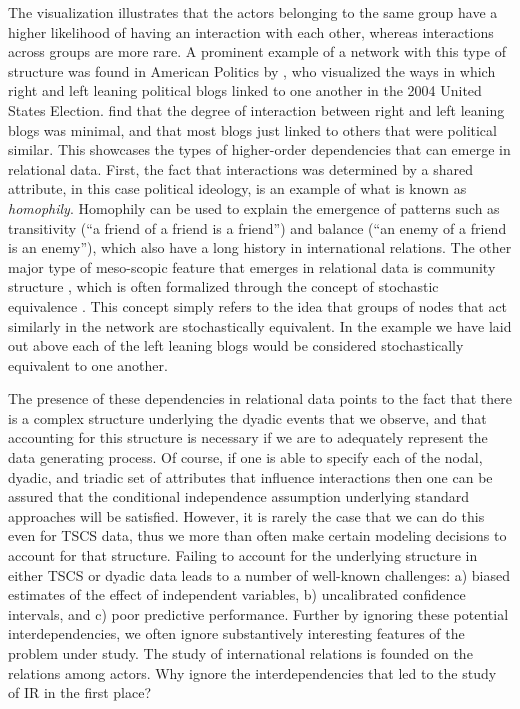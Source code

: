 The visualization illustrates that the actors belonging to the same group have a higher likelihood of having an interaction with each other, whereas interactions across groups are more rare. A prominent example of a network with this type of structure was found in American Politics by \citet{adamic:glance:2005}, who visualized the ways in which right and left leaning political blogs linked to one another in the 2004 United States Election. \citeauthor{adamic:glance:2005} find that the degree of interaction between right and left leaning blogs was minimal, and that most blogs just linked to others that were political similar. This showcases the types of higher-order dependencies that can emerge in relational data. First, the fact that interactions was determined by a shared attribute, in this case political ideology, is an example of what is known as \textit{homophily}. Homophily can be used to explain the emergence of patterns such as transitivity (``a friend of a friend is a friend'') and balance (``an enemy of a friend is an enemy''), which also have a long history in international relations. The other major type of meso-scopic feature that emerges in relational data is community structure \citep{mucha:etal:2010}, which is often formalized through the concept of stochastic equivalence \citep{anderson:etal:1992}. This concept simply refers to the idea that groups of nodes that act similarly in the network are stochastically equivalent. In the example we have laid out above each of the left leaning blogs would be considered stochastically equivalent to one another. 

The presence of these dependencies in relational data points to the fact that there is a complex structure underlying the dyadic events that we observe, and that accounting for this structure is necessary if we are to adequately represent the data generating process. Of course, if one is able to specify each of the nodal, dyadic, and triadic set of attributes that influence interactions then one can be assured that the conditional independence assumption underlying standard approaches will be satisfied. However, it is rarely the case that we can do this even for TSCS data, thus we more than often make certain modeling decisions to account for that structure. Failing to account for the underlying structure in either TSCS or dyadic data leads to a number of well-known challenges: a) biased estimates of the effect of independent variables, b) uncalibrated confidence intervals, and c) poor predictive performance. Further by ignoring these potential interdependencies, we often ignore substantively interesting features of the problem under study. The study of international relations is founded on the relations among actors. Why ignore the interdependencies that led to the study of IR in the first place?

